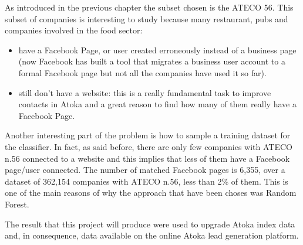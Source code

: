 As introduced in the previous chapter the subset chosen is the ATECO 56. This subset of companies is interesting to study because many restaurant, pubs and companies involved in the food sector:

\begin{itemize}
\item have a Facebook Page, or user created erroneously instead of a business page (now Facebook has built a tool that migrates a business user account to a formal Facebook page but not all the companies have used it so far).
\item still don't have a website: this is a really fundamental task to improve contacts in Atoka and a great reason to find how many of them really have a Facebook Page.
\end{itemize}

Another interesting part of the problem is how to sample a training dataset for the classifier. In fact, as said before, there are only few companies with ATECO n.56 connected to a website and this implies that less of them have a Facebook page/user connected. The number of matched Facebook pages is 6,355, over a dataset of 362,154 companies with ATECO n.56, less than 2\% of them. This is one of the main reasons of why the approach that have been choses was Random Forest.

The result that this project will produce were used to upgrade Atoka index data and, in consequence, data available on the online Atoka lead generation platform.


